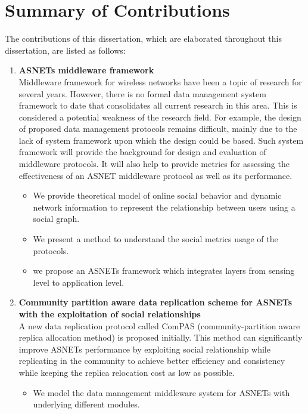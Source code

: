 \section{Summary of Contributions}\label{Chap1_02}

The contributions of this dissertation, which are elaborated throughout this dissertation, are listed as follows:
\begin{enumerate}
    \item \textbf{ASNETs middleware framework}
    \\
    Middleware framework for wireless networks have been a topic of research for several years. However, there is no formal data management system framework to date that consolidates all current research in this area. This is considered a potential weakness of the research field. For example, the design of proposed data management protocols remains difficult, mainly due to the lack of system framework upon which the design could be based. Such system framework will provide the background for design and evaluation of middleware protocols. It will also help to provide metrics for assessing the effectiveness of an ASNET middleware protocol as well as its performance.
        \begin{itemize}
            \item We provide theoretical model of online social behavior and dynamic network information to represent the relationship between users using a social graph.
            \item We present a method to understand the social metrics usage of the protocols.
            \item we propose an ASNETs framework which integrates layers from sensing level to application level.
        \end{itemize}
    \item \textbf{Community partition aware data replication scheme for ASNETs with the exploitation of social relationships}
    \\
    A new data replication protocol called ComPAS (community-partition aware replica allocation method) is proposed initially. This method can significantly improve ASNETs performance by exploiting social relationship while replicating in the community to achieve better efficiency and consistency while keeping the replica relocation cost as low as possible.
        \begin{itemize}
            \item We model the data management middleware system for ASNETs with underlying different modules.

\end{itemize}
\end{enumerate}
